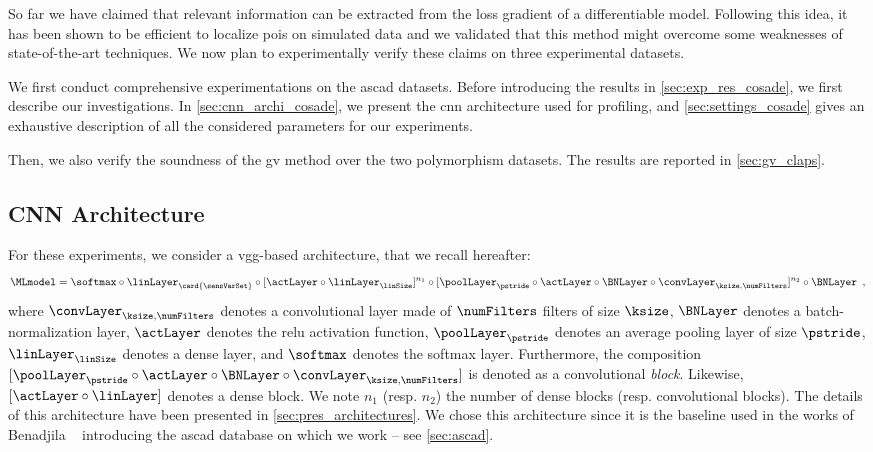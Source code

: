 So far we have claimed that relevant information can be extracted from the loss gradient of a differentiable model.
Following this idea, it has been shown to be efficient to localize \glspl{poi} on simulated data and we validated that this method might overcome some weaknesses of state-of-the-art techniques.
We now plan to experimentally verify these claims on three experimental datasets.

We first conduct comprehensive experimentations on the \gls{ascad} datasets.
Before introducing the results in \autoref{sec:exp_res_cosade}, we first describe our investigations.
In \autoref{sec:cnn_archi_cosade}, we present the \gls{cnn} architecture used for profiling, and \autoref{sec:settings_cosade} gives an exhaustive description of all the considered parameters for our experiments.

Then, we also verify the soundness of the \gls{gv} method over the two polymorphism datasets.
The results are reported in \autoref{sec:gv_claps}.

\subsection{CNN Architecture}
\label{sec:cnn_archi_cosade}
For these experiments, we consider a \gls{vgg}-based architecture, that we recall hereafter:
\begin{equation}\label{eq:vgg_archi_cosade}
	\MLmodel = 
	\softmax \circ \linLayer_{\card{\sensVarSet}} \circ [\actLayer \circ \linLayer_\linSize]^{n_1}
	\circ [\poolLayer_\pstride \circ \actLayer \circ \BNLayer \circ \convLayer_{\ksize, \numFilters}]^{n_2} \circ \BNLayer \enspace ,
\end{equation}
where \(\convLayer_{\ksize, \numFilters}\) denotes a convolutional layer made of \(\numFilters\) filters of size \(\ksize\), \(\BNLayer\) denotes a batch-normalization layer, \(\actLayer\) denotes the \gls{relu} activation function, \(\poolLayer_{\pstride}\) denotes an average pooling layer of size \(\pstride\), \(\linLayer_{\linSize}\) denotes a dense layer, and \(\softmax\) denotes the softmax layer.
Furthermore, the composition \([\poolLayer_{\pstride} \circ \actLayer \circ \BNLayer \circ \convLayer_{\ksize, \numFilters}]\) is denoted as a convolutional \emph{block}.
Likewise, \([\actLayer \circ \linLayer]\) denotes a dense block.
We note \(n_1\) (resp. \(n_2\)) the number of dense blocks (resp. convolutional blocks).
The details of this architecture have been presented in \autoref{sec:pres_architectures}.
We chose this architecture since it is the baseline used in the works of Benadjila \etal{}~\cite{prouff_study_2018} introducing the \gls{ascad} database on which we work -- see \autoref{sec:ascad}.

